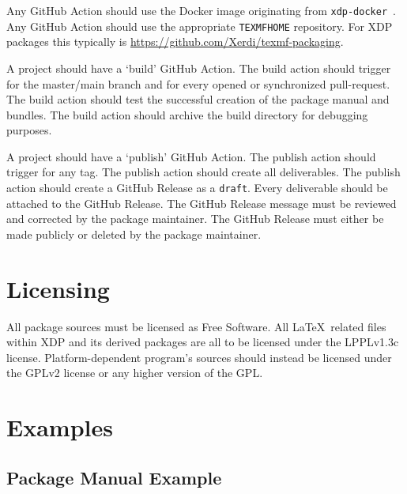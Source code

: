 \documentclass{xdpdoc}
\begin{document}
    Any GitHub Action should use the Docker image originating from \texttt{xdp-docker}~\cite{xdp-docker}.
    Any GitHub Action should use the appropriate \texttt{TEXMFHOME} repository.
    For XDP packages this typically is \url{https://github.com/Xerdi/texmf-packaging}.

    A project should have a `build' GitHub Action.
    The build action should trigger for the master/main branch and for every opened or synchronized pull-request.
    The build action should test the successful creation of the package manual and bundles.
    The build action should archive the build directory for debugging purposes.

    A project should have a `publish' GitHub Action.
    The publish action should trigger for any tag.
    The publish action should create all deliverables.
    The publish action should create a GitHub Release as a \texttt{draft}.
    Every deliverable should be attached to the GitHub Release.
    The GitHub Release message must be reviewed and corrected by the package maintainer.
    The GitHub Release must either be made publicly or deleted by the package maintainer.


    \section{Licensing}

    All package sources must be licensed as Free Software.
    All \LaTeX\ related files within XDP and its derived packages are all to be licensed under the LPPLv1.3c license.
    Platform-dependent program's sources should instead be licensed under the GPLv2 license or any higher version of the GPL\@.

    \clearpage


    \section{Examples}

    \subsection{Package Manual Example}

    

    \clearpage
\end{document}
